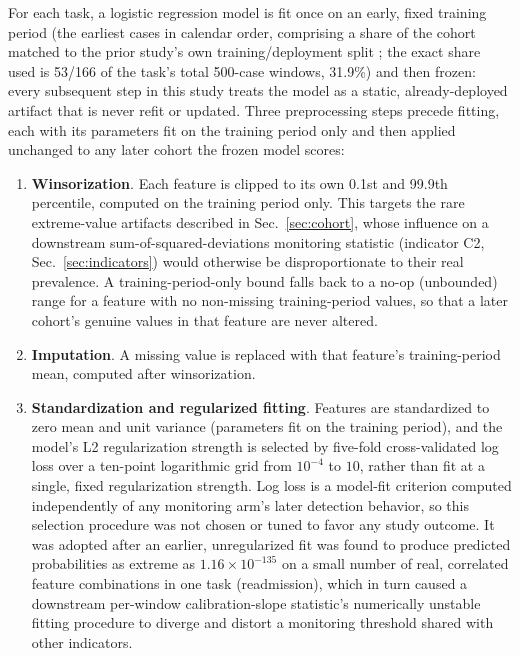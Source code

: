 \documentclass[apajournal,article,submit,oneauthor]{Definitions/mdpi}
\begin{document}
For each task, a logistic regression model is fit once on an early, fixed training period (the earliest cases in calendar order, comprising a share of the cohort matched to the prior study's own training/deployment split \citep{yu2026deferral}; the exact share used is 53/166 of the task's total 500-case windows, 31.9\%) and then frozen: every subsequent step in this study treats the model as a static, already-deployed artifact that is never refit or updated. Three preprocessing steps precede fitting, each with its parameters fit on the training period only and then applied unchanged to any later cohort the frozen model scores:

\begin{enumerate}
\item \textbf{Winsorization}. Each feature is clipped to its own 0.1st and 99.9th percentile, computed on the training period only. This targets the rare extreme-value artifacts described in Sec.~\ref{sec:cohort}, whose influence on a downstream sum-of-squared-deviations monitoring statistic (indicator C2, Sec.~\ref{sec:indicators}) would otherwise be disproportionate to their real prevalence. A training-period-only bound falls back to a no-op (unbounded) range for a feature with no non-missing training-period values, so that a later cohort's genuine values in that feature are never altered.
\item \textbf{Imputation}. A missing value is replaced with that feature's training-period mean, computed after winsorization.
\item \textbf{Standardization and regularized fitting}. Features are standardized to zero mean and unit variance (parameters fit on the training period), and the model's L2 regularization strength is selected by five-fold cross-validated log loss over a ten-point logarithmic grid from $10^{-4}$ to $10$, rather than fit at a single, fixed regularization strength. Log loss is a model-fit criterion computed independently of any monitoring arm's later detection behavior, so this selection procedure was not chosen or tuned to favor any study outcome. It was adopted after an earlier, unregularized fit was found to produce predicted probabilities as extreme as $1.16\times10^{-135}$ on a small number of real, correlated feature combinations in one task (readmission), which in turn caused a downstream per-window calibration-slope statistic's numerically unstable fitting procedure to diverge and distort a monitoring threshold shared with other indicators.
\end{enumerate}
\end{document}
